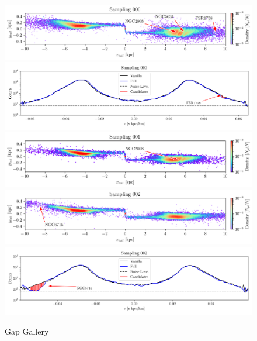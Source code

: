 \documentclass[draft]{aa}
\begin{document}
\begin{appendix}
    \begin{figure}
      \centering
      \includegraphics[width=\linewidth]{gallery_of_gaps_monte-carlo-000.png}
      \includegraphics[width=\linewidth]{tau-profile-monte-carlo-000.png}
      \includegraphics[width=\linewidth]{gallery_of_gaps_monte-carlo-001.png}
      \includegraphics[width=\linewidth]{gallery_of_gaps_monte-carlo-002.png}
      \includegraphics[width=\linewidth]{tau-profile-monte-carlo-002.png}
      \caption{Gap Gallery}
      \label{fig:gallery0}
      \end{figure}    



\end{appendix}
\end{document}
